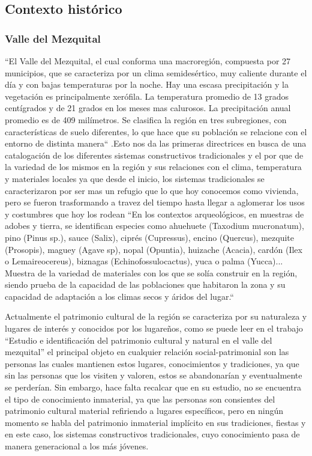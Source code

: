 \subsection{Contexto histórico}
\subsubsection{Valle del Mezquital}
``El Valle del Mezquital, el cual conforma una macroregión, compuesta por 27 municipios, que se caracteriza por un clima semidesértico, muy caliente durante el día y con bajas temperaturas por la noche. Hay una escasa precipitación y la vegetación es principalmente xerófila. La temperatura promedio de 13 grados centígrados y de 21 grados en los meses mas calurosos. La precipitación anual promedio es de 409 milímetros. Se clasifica la región en tres subregiones, con características de suelo diferentes, lo que hace que su población se relacione con el entorno de distinta manera`` \citep{alvarez2003maguey}.Esto nos da las primeras directrices en busca de una catalogación de los diferentes sistemas constructivos tradicionales y el por que de la variedad de los mismos en la región y sus relaciones con el clima, temperatura y materiales locales ya que desde el inicio, los sistemas tradicionales se caracterizaron por ser mas un refugio que lo que hoy conocemos como vivienda, pero se fueron trasformando a travez del tiempo hasta llegar a aglomerar los usos y costumbres que hoy los rodean ``En los contextos arqueológicos, en muestras de adobes y tierra, se identifican especies como ahuehuete (Taxodium mucronatum), pino (Pinus sp.), sauce (Salix), ciprés (Cupressus), encino (Quercus), mezquite (Prosopis), maguey (Agave sp), nopal (Opuntia), huizache (Acacia), cardón (Ilex o Lemaireocereus), biznagas (Echinofossulocactus), yuca o palma (Yucca)... Muestra de la variedad de materiales con los que se solía construir en la región, siendo prueba de la capacidad de las poblaciones que habitaron la zona y su capacidad de adaptación a los climas secos y áridos del lugar.``\citep[5]{aguilar2009}

Actualmente el patrimonio cultural de la región se caracteriza por su naturaleza y lugares de interés y conocidos por los lugareños, como se puede leer en el trabajo ``Estudio e identificación del patrimonio cultural y natural en el valle del mezquital''\citep{rodriguezestudio} el principal objeto en cualquier relación social-patrimonial son las personas las cuales mantienen estos lugares, conocimientos y tradiciones, ya que sin las personas que los visiten y valoren, estos se abandonarían y eventualmente se perderían. Sin embargo, hace falta recalcar que en su estudio, no se encuentra el tipo de conocimiento inmaterial, ya que las personas son consientes del patrimonio cultural material refiriendo a lugares específicos, pero en ningún momento se habla del patrimonio inmaterial implícito en sus tradiciones, fiestas y en este caso, los sistemas constructivos tradicionales, cuyo conocimiento pasa de manera generacional a los más jóvenes.

